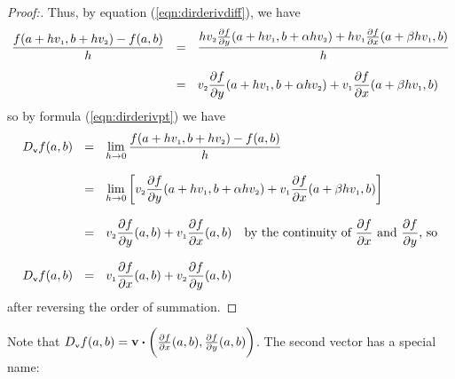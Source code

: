 \begin{proofbar}
\begin{proof}[Proof:]
 Thus, by equation (\ref{eqn:dirderivdiff}), we have
 \begin{align*}
  \frac{f(a+hv_{\scriptscriptstyle 1},b+hv_{\scriptscriptstyle 2}) - f(a,b)}{h} ~~ &= ~~
   \frac{hv_{\scriptscriptstyle 2}\tfrac{\partial f}{\partial y}(a+hv_{\scriptscriptstyle 1},b+\alpha hv_{\scriptscriptstyle 2}) +
    hv_{\scriptscriptstyle 1} \tfrac{\partial f}{\partial x}(a+\beta hv_{\scriptscriptstyle 1},b)}{h}\\[6pt]
   &= ~~ v_{\scriptscriptstyle 2}\frac{\partial f}{\partial y}(a+hv_{\scriptscriptstyle 1},b+\alpha hv_{\scriptscriptstyle 2}) +
    v_{\scriptscriptstyle 1} \frac{\partial f}{\partial x}(a+\beta hv_{\scriptscriptstyle 1},b)
 \end{align*}
 so by formula (\ref{eqn:dirderivpt}) we have
 \begin{align*}
  D_{\scriptscriptstyle \textbf{v}}f(a,b) ~~ &= ~~ \lim_{h \to 0} \dfrac{f(a+hv_{\scriptscriptstyle 1},b+hv_{\scriptscriptstyle 2}) - f(a,b)}{h}\\[8pt]
   &= ~~ \lim_{h \to 0} \left[ v_{\scriptscriptstyle 2}\frac{\partial f}{\partial y}(a+hv_{\scriptscriptstyle 1},b+\alpha hv_{\scriptscriptstyle 2}) +
    v_{\scriptscriptstyle 1} \frac{\partial f}{\partial x}(a+\beta hv_{\scriptscriptstyle 1},b) \right]\\[8pt]
   &= ~~ v_{\scriptscriptstyle 2}\frac{\partial f}{\partial y}(a,b) +
    v_{\scriptscriptstyle 1}\frac{\partial f}{\partial x}(a,b) \text{~~~by the continuity of $\frac{\partial f}{\partial x}$ and
     $\frac{\partial f}{\partial y}$, so}\\[8pt]
   D_{\scriptscriptstyle \textbf{v}}f(a,b) ~~ &= ~~ v_{\scriptscriptstyle 1}\frac{\partial f}{\partial x}(a,b) +
    v_{\scriptscriptstyle 2}\frac{\partial f}{\partial y}(a,b)
 \end{align*}
 after reversing the order of summation.
\end{proof}\end{proofbar}

Note that $D_{\scriptscriptstyle \textbf{v}}f(a,b) = \textbf{v} \bm{\cdot} \biggl(\frac{\partial f}{\partial x}(a,b),
\frac{\partial f}{\partial y}(a,b)\biggr)$. The second vector has a special name:



